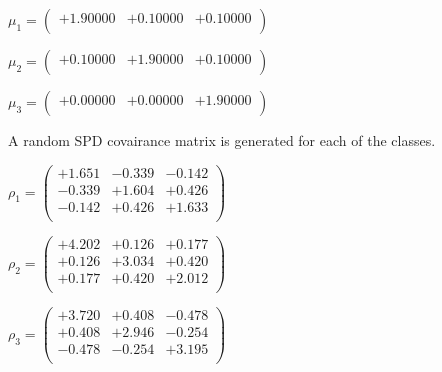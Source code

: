 \documentclass[9pt]{article}
\theoremstyle{plain}
\theoremstyle{definition}
\theoremstyle{remark}
\numberwithin{equation}{section}
\begin{document}
$\mu_1 = \left(
\begin{array}{
ccc}
+1.90000 & +0.10000 & +0.10000 \\
\end{array}
\right)$ \newline 

$\mu_2 = \left(
\begin{array}{
ccc}
+0.10000 & +1.90000 & +0.10000 \\
\end{array}
\right)$ \newline 

$\mu_3 = \left(
\begin{array}{
ccc}
+0.00000 & +0.00000 & +1.90000 \\
\end{array}
\right)$ \newline 

A random SPD covairance matrix is generated for each of the classes.\newline

$\rho_1 = \left(
\begin{array}{
ccc}
+1.651 & -0.339 & -0.142 \\
-0.339 & +1.604 & +0.426 \\
-0.142 & +0.426 & +1.633 \\
\end{array}
\right)$ \newline 

$\rho_2 = \left(
\begin{array}{
ccc}
+4.202 & +0.126 & +0.177 \\
+0.126 & +3.034 & +0.420 \\
+0.177 & +0.420 & +2.012 \\
\end{array}
\right)$ \newline 

$\rho_3 = \left(
\begin{array}{
ccc}
+3.720 & +0.408 & -0.478 \\
+0.408 & +2.946 & -0.254 \\
-0.478 & -0.254 & +3.195 \\
\end{array}
\right)$ \newline 
\end{document}
